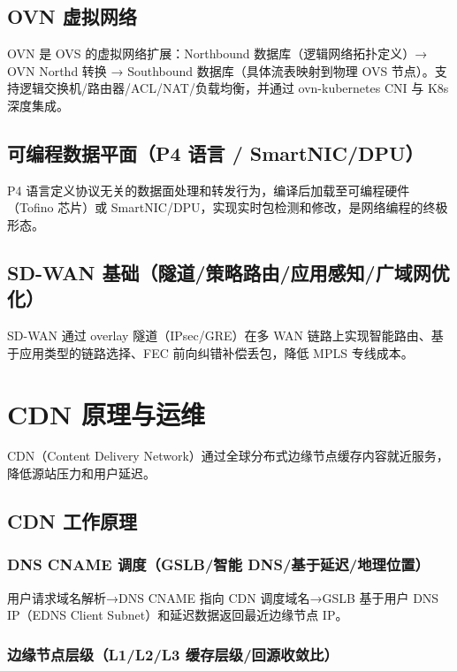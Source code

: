 \documentclass[12pt,UTF8]{ctexbook}
\begin{document}
  \section{OVN 虚拟网络}

OVN 是 OVS 的虚拟网络扩展：Northbound 数据库（逻辑网络拓扑定义）→ OVN Northd 转换 → Southbound 数据库（具体流表映射到物理 OVS 节点）。支持逻辑交换机/路由器/ACL/NAT/负载均衡，并通过 ovn-kubernetes CNI 与 K8s 深度集成。

  \section{可编程数据平面（P4 语言 / SmartNIC/DPU）}

P4 语言定义协议无关的数据面处理和转发行为，编译后加载至可编程硬件（Tofino 芯片）或 SmartNIC/DPU，实现实时包检测和修改，是网络编程的终极形态。

  \section{SD-WAN 基础（隧道/策略路由/应用感知/广域网优化）}

SD-WAN 通过 overlay 隧道（IPsec/GRE）在多 WAN 链路上实现智能路由、基于应用类型的链路选择、FEC 前向纠错补偿丢包，降低 MPLS 专线成本。


\chapter{CDN 原理与运维}
\label{chap:cdn}

CDN（Content Delivery Network）通过全球分布式边缘节点缓存内容就近服务，降低源站压力和用户延迟。

  \section{CDN 工作原理}
    \subsection{DNS CNAME 调度（GSLB/智能 DNS/基于延迟/地理位置）}

用户请求域名解析→DNS CNAME 指向 CDN 调度域名→GSLB 基于用户 DNS IP（EDNS Client Subnet）和延迟数据返回最近边缘节点 IP。

    \subsection{边缘节点层级（L1/L2/L3 缓存层级/回源收敛比）}
\end{document}
